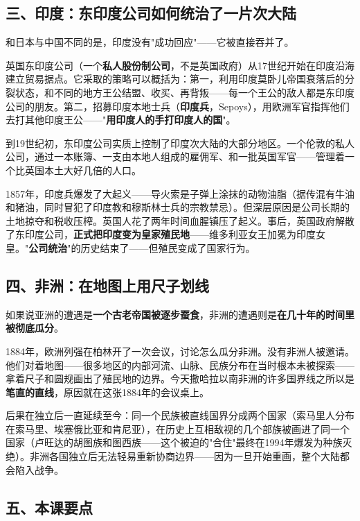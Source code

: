 \documentclass[a4paper,12pt]{ctexart}
\begin{document}
\subsection*{三、印度：东印度公司如何统治了一片次大陆}

和日本与中国不同的是，印度没有"成功回应"——它被直接吞并了。

英国东印度公司（一个\textbf{私人股份制公司}，不是英国政府）从17世纪开始在印度沿海建立贸易据点。它采取的策略可以概括为：第一，利用印度莫卧儿帝国衰落后的分裂状态，和不同的地方王公结盟、收买、再背叛——每一个王公的敌人都是东印度公司的朋友。第二，招募印度本地士兵（\textbf{印度兵}，Sepoys），用欧洲军官指挥他们去打其他印度王公——"\textbf{用印度人的手打印度人的国}"。

到19世纪初，东印度公司实质上控制了印度次大陆的大部分地区。一个伦敦的私人公司，通过一本账簿、一支由本地人组成的雇佣军、和一批英国军官——管理着一个比英国本土大好几倍的人口。

1857年，印度兵爆发了大起义——导火索是子弹上涂抹的动物油脂（据传混有牛油和猪油，同时冒犯了印度教和穆斯林士兵的宗教禁忌）。但深层原因是公司长期的土地掠夺和税收压榨。英国人花了两年时间血腥镇压了起义。事后，英国政府解散了东印度公司，\textbf{正式把印度变为皇家殖民地}——维多利亚女王加冕为印度女皇。"\textbf{公司统治}"的历史结束了——但殖民变成了国家行为。

\subsection*{四、非洲：在地图上用尺子划线}

如果说亚洲的遭遇是\textbf{一个古老帝国被逐步蚕食}，非洲的遭遇则是\textbf{在几十年的时间里被彻底瓜分}。

1884年，欧洲列强在柏林开了一次会议，讨论怎么瓜分非洲。没有非洲人被邀请。他们对着地图——很多地区的内部河流、山脉、民族分布在当时根本未被探索——拿着尺子和圆规画出了殖民地的边界。今天撒哈拉以南非洲的许多国界线之所以是\textbf{笔直的直线}，原因就在这张1884年的会议桌上。

后果在独立后一直延续至今：同一个民族被直线国界分成两个国家（索马里人分布在索马里、埃塞俄比亚和肯尼亚），在历史上互相敌视的几个部族被画进了同一个国家（卢旺达的胡图族和图西族——这个被迫的"合住"最终在1994年爆发为种族灭绝）。非洲各国独立后无法轻易重新协商边界——因为一旦开始重画，整个大陆都会陷入战争。

\subsection*{五、本课要点}
\end{document}

